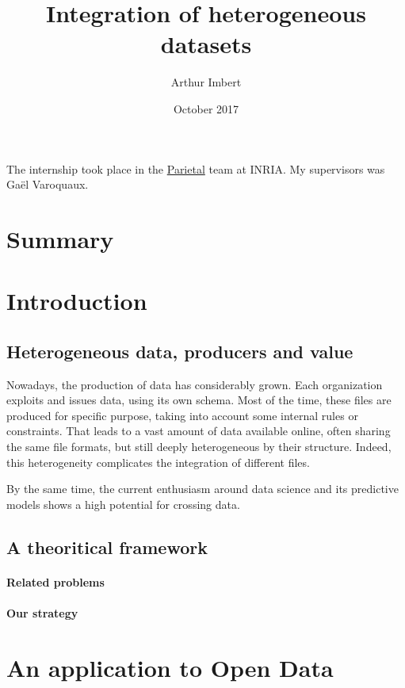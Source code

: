 \documentclass[a4paper]{article}
\author{Arthur Imbert}
\title{Integration of heterogeneous datasets}
\date{October 2017}
\begin{document}
	
	\maketitle
	
	The internship took place in the \href{https://team.inria.fr/parietal/}{Parietal} team at INRIA. My supervisors was Ga\"el Varoquaux.
	
	\section{Summary}
	
	\section{Introduction}
	
	\subsection{Heterogeneous data, producers and value}
	
	Nowadays, the production of data has considerably grown. Each organization exploits and issues data, using its own schema. Most of the time, these files are produced for specific purpose, taking into account some internal rules or constraints. That leads to a vast amount of data available online, often sharing the same file formats, but still deeply heterogeneous by their structure. Indeed, this heterogeneity complicates the integration of different files.
	
	By the same time, the current enthusiasm around data science and its predictive models shows a high potential for crossing data. 
	
	\subsection{A theoritical framework}
	
	\paragraph{Related problems}
	
	\paragraph{Our strategy}
	
	\section{An application to Open Data}
	
\end{document}
